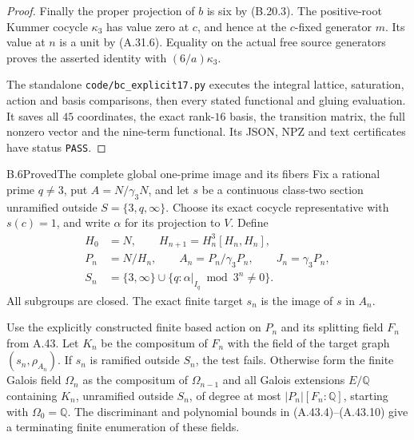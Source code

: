 \begin{proof}
Finally the proper projection of $b$ is six
by (B.20.3). The positive-root Kummer cocycle
$\kappa_3$ has value zero at $c$, and hence at
the $c$-fixed generator $m$. Its value at $n$
is a unit by (A.31.6). Equality on the actual
free source generators proves the asserted
identity with $(6/a)\kappa_3$.

The standalone
\texttt{code/bc\_explicit17.py} executes the
integral lattice, saturation, action and basis
comparisons, then every stated functional and
gluing evaluation. It saves all $45$ coordinates,
the exact rank-$16$ basis, the transition matrix,
the full nonzero vector and the nine-term
functional. Its JSON, NPZ and text certificates
have status \texttt{PASS}.
\end{proof}

\begin{statement}{B.6}{Proved}{The complete global one-prime image and its fibers}
Fix a rational prime $q\ne3$, put
$A=N/\gamma_3N$, and let $s$ be a continuous
class-two section unramified outside
$S=\{3,q,\infty\}$. Choose its exact cocycle
representative with $s(c)=1$, and write $\alpha$
for its projection to $V$. Define
\[
 \begin{split}
 H_0&=N,\qquad H_{n+1}=H_n^3[H_n,H_n],\\
 P_n&=N/H_n,\qquad A_n=P_n/\gamma_3P_n,\qquad
 J_n=\gamma_3P_n,\\
 S_n&=\{3,\infty\}\cup
 \{q:\alpha|_{I_q}\bmod3^n\ne0\}.
 \end{split}                                               \tag{B.6.1}
\]
All subgroups are closed. The exact finite target
$s_n$ is the image of $s$ in $A_n$.

Use the explicitly constructed finite based action on
$P_n$ and its splitting field $F_n$ from A.43.
Let $K_n$ be the compositum of $F_n$ with the
field of the target graph $(s_n,\rho_{A_n})$.
If $s_n$ is ramified outside $S_n$, the test fails.
Otherwise form the finite Galois field $\Omega_n$
as the compositum of $\Omega_{n-1}$ and all Galois
extensions $E/\mathbb Q$ containing $K_n$,
unramified outside $S_n$, of degree at most
$|P_n|[F_n:\mathbb Q]$, starting with
$\Omega_0=\mathbb Q$.
The discriminant and polynomial bounds in
(A.43.4)--(A.43.10) give a terminating finite
enumeration of these fields.


\end{statement}
